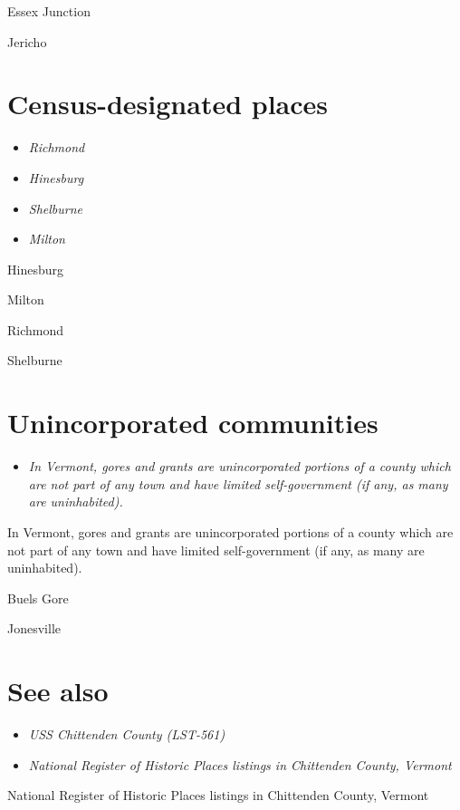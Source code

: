Essex Junction

Jericho

\section{Census-designated places}\label{census-designated-places}

\begin{itemize}
\item
  \emph{Richmond}
\item
  \emph{Hinesburg}
\item
  \emph{Shelburne}
\item
  \emph{Milton}
\end{itemize}

Hinesburg

Milton

Richmond

Shelburne

\section{Unincorporated communities}\label{unincorporated-communities}

\begin{itemize}
\item
  \emph{In Vermont, gores and grants are unincorporated portions of a
  county which are not part of any town and have limited self-government
  (if any, as many are uninhabited).}
\end{itemize}

In Vermont, gores and grants are unincorporated portions of a county
which are not part of any town and have limited self-government (if any,
as many are uninhabited).

Buels Gore

Jonesville

\section{See also}\label{see-also}

\begin{itemize}
\item
  \emph{USS Chittenden County (LST-561)}
\item
  \emph{National Register of Historic Places listings in Chittenden
  County, Vermont}
\end{itemize}

National Register of Historic Places listings in Chittenden County,
Vermont

